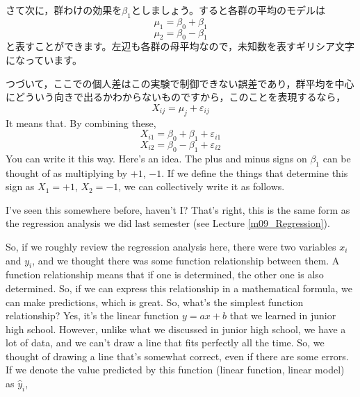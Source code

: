 \documentclass{ltjbook}
\begin{document}
さて次に，群わけの効果を$\beta_1$としましょう。すると各群の平均のモデルは
\[ \mu_1= \beta_0 + \beta_1 \]
\[ \mu_2 = \beta_0  -\beta_1 \]
と表すことができます。左辺も各群の母平均なので，未知数を表すギリシア文字になっています。

つづいて，ここでの個人差はこの実験で制御できない誤差であり，群平均を中心にどういう向きで出るかわからないものですから，このことを表現するなら，
\[ X_{ij} = \mu_j + \varepsilon_{ij} \]
It means that. By combining these,
\[ X_{i1} = \beta_0 + \beta_1 + \varepsilon_{i1} \]
\[ X_{i2} = \beta_0 - \beta_1 + \varepsilon_{i2} \]
You can write it this way. Here's an idea. The plus and minus signs on $\beta_1$ can be thought of as multiplying by $+1$, $-1$. If we define the things that determine this sign as $X_{1}=+1$, $X_{2}=-1$, we can collectively write it as follows.

I've seen this somewhere before, haven't I? That's right, this is the same form as the regression analysis we did last semester (see Lecture \ref{m09_Regression}).

So, if we roughly review the regression analysis here, there were two variables $x_i$ and $y_i$, and we thought there was some function relationship between them. A function relationship means that if one is determined, the other one is also determined. So, if we can express this relationship in a mathematical formula, we can make predictions, which is great. So, what's the simplest function relationship? Yes, it's the linear function $y=ax+b$ that we learned in junior high school. However, unlike what we discussed in junior high school, we have a lot of data, and we can't draw a line that fits perfectly all the time. So, we thought of drawing a line that's somewhat correct, even if there are some errors. If we denote the value predicted by this function (linear function, linear model) as $\hat{y}_i$,
\end{document}
